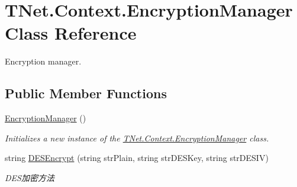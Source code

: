 \hypertarget{class_t_net_1_1_context_1_1_encryption_manager}{}\section{T\+Net.\+Context.\+Encryption\+Manager Class Reference}
\label{class_t_net_1_1_context_1_1_encryption_manager}


Encryption manager.  


\subsection*{Public Member Functions}
\begin{DoxyCompactItemize}
\item 
\mbox{\hyperlink{class_t_net_1_1_context_1_1_encryption_manager_a5e2c6bddb36ca9a312b620cc71b3fc1d}{Encryption\+Manager}} ()
\begin{DoxyCompactList}\small\item\em Initializes a new instance of the \mbox{\hyperlink{class_t_net_1_1_context_1_1_encryption_manager}{T\+Net.\+Context.\+Encryption\+Manager}} class. \end{DoxyCompactList}\item 
string \mbox{\hyperlink{class_t_net_1_1_context_1_1_encryption_manager_aa40e1fd76edccf45f57a7bbab11acc0e}{D\+E\+S\+Encrypt}} (string str\+Plain, string str\+D\+E\+S\+Key, string str\+D\+E\+S\+IV)
\begin{DoxyCompactList}\small\item\em D\+E\+S加密方法 \end{DoxyCompactList}\end{DoxyCompactItemize}

